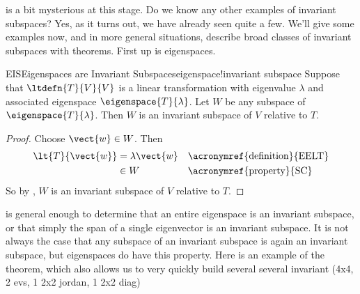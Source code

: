 %
 is a bit mysterious at this stage.   Do we know any other examples of invariant subspaces?  Yes, as it turns out, we have already seen quite a few.  We'll give some examples now, and in more general situations, describe broad classes of invariant subspaces with theorems.  First up is eigenspaces.
%
\begin{theorem}{EIS}{Eigenspaces are Invariant Subspaces}{eigenspace!invariant subspace}
Suppose that $\ltdefn{T}{V}{V}$ is a linear transformation with eigenvalue $\lambda$ and associated eigenspace $\eigenspace{T}{\lambda}$.  Let $W$ be any subspace of $\eigenspace{T}{\lambda}$.  Then $W$ is an invariant subspace of $V$ relative to $T$.
\end{theorem}
%
\begin{proof}
Choose $\vect{w}\in W$.  Then
%
\begin{align*}
\lt{T}{\vect{w}}
&=\lambda\vect{w}&&\text{\acronymref{definition}{EELT}}\\
&\in W&&\text{\acronymref{property}{SC}}
\end{align*}
%
So by , $W$ is an invariant subspace of $V$ relative to $T$.
\end{proof}
%
 is general enough to determine that an entire eigenspace is an invariant subspace, or that simply the span of a single eigenvector is an invariant subspace.  It is not always the case that any subspace of an invariant subspace is again an invariant subspace, but eigenspaces do have this property.  Here is an example of the theorem, which also allows us to very quickly build several several invariant (4x4, 2 evs, 1 2x2 jordan, 1 2x2 diag)
%
